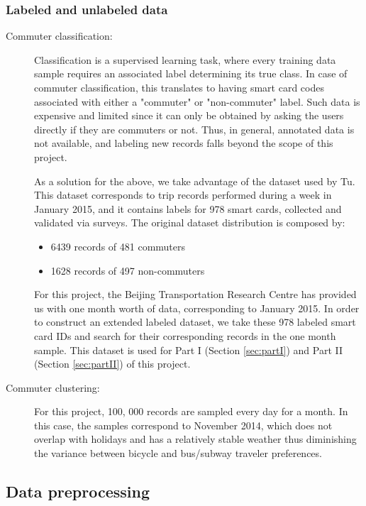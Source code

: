 \documentclass{article}
\begin{document}
\subsubsection{Labeled and unlabeled data}
\begin{description}%
\item[Commuter classification:]
Classification is a supervised learning task, where every training data sample requires an associated label determining its true class. In case of commuter classification, this translates to having smart card codes associated with either a "commuter" or "non-commuter" label. Such data is expensive and limited since it can only be obtained by asking the users directly if they are commuters or not. Thus, in general, annotated data is not available, and labeling new records falls beyond the scope of this project. 

As a solution for the above, we take advantage of the dataset used by Tu\cite{tu2016impact}. This dataset corresponds to trip records performed during a week in January 2015, and it contains labels for 978 smart cards, collected and validated via surveys. The original dataset distribution is composed by:

\begin{itemize}
\item 6439 records of 481 commuters
\item 1628 records of 497 non-commuters
\end{itemize}

For this project, the Beijing Transportation Research Centre has provided us with one month worth of data, corresponding to January 2015. In order to construct an extended labeled dataset, we take these 978 labeled smart card IDs and search for their corresponding records in the one month sample. This dataset is used for Part I (Section \ref{sec:partI}) and Part II (Section \ref{sec:partII}) of this project. 

\item[Commuter clustering:]
For this project, 100, 000 records are sampled every day for a month. In this case, the samples correspond to November 2014, which does not overlap with holidays and has a relatively stable weather thus diminishing the variance between bicycle and bus/subway traveler preferences.

\end{description}

\subsection{Data preprocessing}
\end{document}
